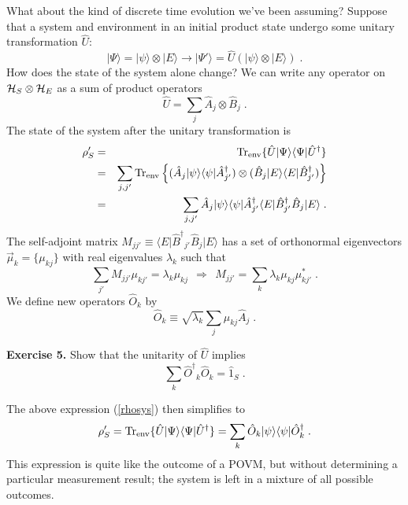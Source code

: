 \documentclass[12pt]{article}
\def\bra#1{{\langle #1 |}}
\def\ket#1{{| #1 \rangle}}
\def\id{{\hat 1}}
\def\tr{{\rm Tr}}
\def\U{{\hat U}}
\def\Udag{{\hat U^\dagger}}
\def\O{{\hat O}}
\def\Odag{{\hat O^\dagger}}
\def\A{{\hat A}}
\def\Adag{{\hat A^\dagger}}
\def\B{{\hat B}}
\def\Bdag{{\hat B^\dagger}}
\begin{document}
What about the kind of discrete time evolution we've been assuming?
Suppose that a system and environment in an initial product state
undergo some unitary transformation $\U$:
\begin{equation}
\ket\Psi = \ket\psi\otimes\ket{E}
  \rightarrow \ket{\Psi'} = \U \left( \ket\psi\otimes\ket{E} \right) \;.
\end{equation}
How does the state of the system alone change?  We can write any operator
on ${\cal H}_S\otimes{\cal H}_E$ as a sum of product
operators
\begin{equation}
\U = \sum_j \A_j \otimes \B_j \;.
\end{equation}
The state of the system after the unitary transformation is
\begin{eqnarray}
\rho'_S &=& \tr_{\rm env} \{ \U \ket\Psi\bra\Psi \Udag \} \nonumber\\
&=&  \sum_{j,j'} \tr_{\rm env} \left\{
  (\A_j\ket\psi\bra\psi\Adag_{j'})\otimes
  (\B_j\ket{E}\bra{E}\Bdag_{j'}) \right\} \nonumber\\
&=&  \sum_{j,j'}
  \A_j\ket\psi\bra\psi\Adag_{j'}
  \bra{E}\Bdag_{j'}\B_j\ket{E} \;.
\label{rhosys}
\end{eqnarray}
The self-adjoint matrix $M_{jj'} \equiv \bra{E}\Bdag_{j'}\B_j\ket{E}$
has a set of orthonormal eigenvectors $\vec\mu_k = \{\mu_{kj}\}$
with real eigenvalues $\lambda_k$ such that
\begin{equation}
\sum_{j'} M_{jj'}\mu_{kj'} = \lambda_k \mu_{kj}\ \ 
  \Rightarrow\ \ M_{jj'} = \sum_k \lambda_k \mu_{kj}\mu^*_{kj'} \;.
\label{eigenvecs}
\end{equation}
We define new operators $\O_k$ by
\begin{equation}
\O_k \equiv \sqrt{\lambda_k} \sum_j \mu_{kj} \A_j \;.
\label{eigen_operators}
\end{equation}

\medskip\noindent
{\bf Exercise 5.}  Show that the unitarity of $\U$ implies
\begin{equation}
\sum_k \Odag_k\O_k = \id_S \;.
\end{equation}
\medskip

The above expression (\ref{rhosys}) then simplifies to
\begin{equation}
\rho'_S = \tr_{\rm env} \{ \U \ket\Psi\bra\Psi \Udag \}
  = \sum_k \O_k \ket\psi\bra\psi \Odag_k \;.
\end{equation}
This expression is quite like the outcome of a POVM, but without determining
a particular measurement result; the system is left in a mixture of all
possible outcomes.
\end{document}
